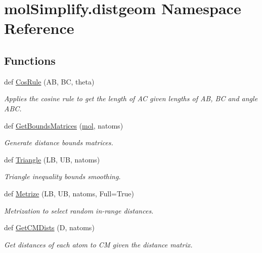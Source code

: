 \hypertarget{namespacemolSimplify_1_1distgeom}{}\section{mol\+Simplify.\+distgeom Namespace Reference}
\label{namespacemolSimplify_1_1distgeom}
\subsection*{Functions}
\begin{DoxyCompactItemize}
\item 
def \hyperlink{namespacemolSimplify_1_1distgeom_a4acf9d8d49cd4e59048bfd34a8ca694f}{Cos\+Rule} (AB, BC, theta)
\begin{DoxyCompactList}\small\item\em Applies the cosine rule to get the length of AC given lengths of AB, BC and angle A\+BC. \end{DoxyCompactList}\item 
def \hyperlink{namespacemolSimplify_1_1distgeom_a96dab17a0c3b3ca663bcbc695f46d1b4}{Get\+Bounds\+Matrices} (\hyperlink{namespacemolSimplify_1_1distgeom_a1ec709e458f1fd6d747723c8b11e8c01}{mol}, natoms)
\begin{DoxyCompactList}\small\item\em Generate distance bounds matrices. \end{DoxyCompactList}\item 
def \hyperlink{namespacemolSimplify_1_1distgeom_ae87d97e79600fafa6255331c1b738af6}{Triangle} (LB, UB, natoms)
\begin{DoxyCompactList}\small\item\em Triangle inequality bounds smoothing. \end{DoxyCompactList}\item 
def \hyperlink{namespacemolSimplify_1_1distgeom_aeea656ddbab4cd45d9229cf937cc5166}{Metrize} (LB, UB, natoms, Full=True)
\begin{DoxyCompactList}\small\item\em Metrization to select random in-\/range distances. \end{DoxyCompactList}\item 
def \hyperlink{namespacemolSimplify_1_1distgeom_a0e20f4ca4b2932cc006bc638df4fe07b}{Get\+C\+M\+Dists} (D, natoms)
\begin{DoxyCompactList}\small\item\em Get distances of each atom to CM given the distance matrix. \end{DoxyCompactList}\item 

\end{DoxyCompactItemize}
